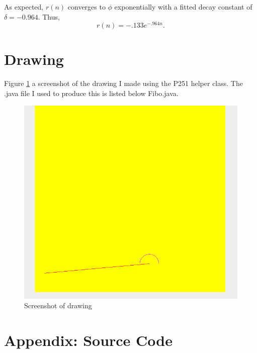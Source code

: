 \documentclass[aps,letterpaper,10pt]{article}
\begin{document}
As expected, $r(n)$ converges to $\phi$ exponentially with a fitted decay constant of $\delta = -0.964$. Thus,$$r(n) = -.133e^{-.964n}.$$
\newpage

\section{Drawing}
Figure \ref{fig: draw} a screenshot of the drawing I made using the P251 helper class. The .java file I used to produce this is listed below Fibo.java.

\begin{figure}[!h]
\centering
\includegraphics[width=.4\textwidth]{Draw/draw.png}
\caption{Screenshot of drawing}
\label{fig: draw}
\end{figure}

\newpage
\section{Appendix: Source Code}

\newpage

\end{document}
